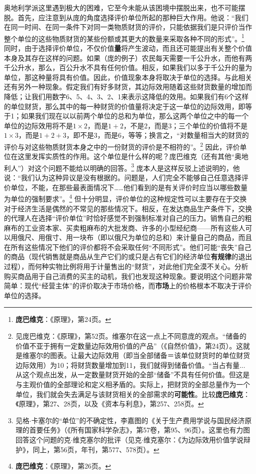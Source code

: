 \documentclass[fontset=fandol, a4paper, 12pt, openright]{ctexbook}
\begin{document}
奥地利学派这里遇到极大的困难，它至今未能从该困境中摆脱出来，也不可能摆脱。首先，应注意到从庞的角度选择评价单位所起的那种巨大作用。他说：“我们在同一时间、在同一条件下对同一类物质财货的评价，只能依据我们是只评价当作整个单位的这些物质财货的某些份额或其更大的数量来采取各种不同的形式”。\footnote{\textbf{庞巴维克}：《原理》，第24页。} 同时，由于选择评价单位，不仅价值\textbf{量}将产生波动，而且还可能提出有关整个价值本身及其存在这样的问题。如果（庞的例子）农民每天需要一千公升水，而他有两千公升水，那么，百公升水不具有任何价值。相反，如果我们以多于千公升的量为单位，那这种量将具有价值。因此，价值现象本身将取决于单位的选择。与此相关还有另外一种现象。假定我们有好多财货，其边际效用随着这些财货数量的增加而降低；让我们用数字6、5、4、3、2、1来表示这降低的效用。如果我们有6个这样的单位财货，那么其中的每一种财货的价值量将决定于这一单位的边际效用，即等于1；如果我们现在以以前两个单位的总和为单位，那么这两个单位之中的每一个单位的边际效用将不是$1 \times 2$，而是$1+2$，不是2，而是3；三个单位的价值将不是$1 \times 3$，而是$1+2+3$，即不是3，而是6，等等；换言之，“对数量相当大的财货的评价与对这些物质财货本身之中的一份财货的评价是不相符的”。\footnote{见庞巴维克：《原理》，第52页。维塞尔在这一点上不同意庞的观点。“储备的价值不亚于拥有一定数量边际效用价值的产品”（《自然价值》，第24页）。这就是维塞尔的图表。让最大边际效用（即当全部储备＝该单位财货时的单位财货边际效用）为10；将财货数量增加到11，我们就得到储备价值。“当占有量...从这个观点出发，从一定数量财货开始的全部“储备”不具有任何价值。但这是与主观价值的全部理论和定义相矛盾的。实际上，把财货的全部总量作为一个单位，我们就会失去满足与该财货相关的全部需求的\textbf{可能性}。比较\textbf{庞巴维克}：《原理》，第27、28页，以及《资本与利息》，第257、258页。} 因此，评价单位在这里发挥实质性的作用。这个单位是什么样的呢？庞巴维克（还有其他“奥地利人”）对这个问题不能给以明确的回答。\footnote{见格$\cdot$卡塞尔的“单位”的不确定性，李嘉图的《关于生产费用学说与国民经济原理的首要任务》（《所有国家科学杂志》，第57卷，第95、96页）。这里也有力图回答这个问题的克$\cdot$维克塞尔的批评（见克$\cdot$维克塞尔：《为边际效用价值学说辩护》，同上，第56页，年刊，第577、578页）。} 庞本人是这样反驳上述说明的，他说：“我们认为这种异议是没有根据的。问题是，人们完全不能够自己任意选择评价单位，不能，在那些最表面情况下……他们看到的是有关评价时应当以哪些数量为单位的强制要求”。\footnote{\textbf{庞巴维克}：《原理》，第26页。} 但十分明显，评价单位的这种规定性可以主要存在于交换对于经济生活是偶然的不常见的那些情况下。相反，在发达商品生产条件下，交换的代理人在选择“评价单位”时恰好感觉不到强制标准对自己的压力。销售自己的粗麻布的工业资本家、买卖粗麻布的大批发商、许多的小型经纪商——所有这些人可以用俄尺、用俄寸、用一块布（即以俄尺为单位的总和）来计量自己的商品，而且在所有这些情况下他们的评价都将不会采取任何“不同形式”。他们可能“丧失”自己的商品（现代销售就是商品从生产它们的或只是占有它们的经济单位\textbf{有规律}的退出过程），而何种实物比例将用于计量售出的“财货”，对此他们完全漠不关心。分析购买商品用于自己消费的买主的动机，我们也发现这种现象。要说明这个问题非常简单：现代“经营主体”的评价取决于市场价格，而\textbf{市场}上的价格根本不取决于评价单位的选择。
\end{document}
